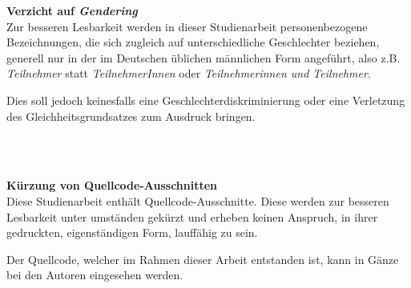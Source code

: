 \vfill
\textbf{Verzicht auf \textit{Gendering}} \\
Zur besseren Lesbarkeit werden in dieser Studienarbeit personenbezogene Bezeichnungen, die sich zugleich auf unterschiedliche Geschlechter beziehen, generell nur in der im Deutschen üblichen männlichen Form angeführt, also z.B. \textit{Teilnehmer} statt \textit{TeilnehmerInnen} oder \textit{Teilnehmerinnen und Teilnehmer}.

Dies soll jedoch keinesfalls eine Geschlechterdiskriminierung oder eine Verletzung des Gleichheitsgrundsatzes zum Ausdruck bringen.

\\\

\textbf{Kürzung von Quellcode-Ausschnitten} \\
Diese Studienarbeit enthält Quellcode-Ausschnitte. Diese werden zur besseren Lesbarkeit unter umständen gekürzt und erheben keinen Anspruch, in ihrer gedruckten, eigenständigen Form, lauffähig zu sein.

Der Quellcode, welcher im Rahmen dieser Arbeit entstanden ist, kann in Gänze bei den Autoren eingesehen werden.

\vfill